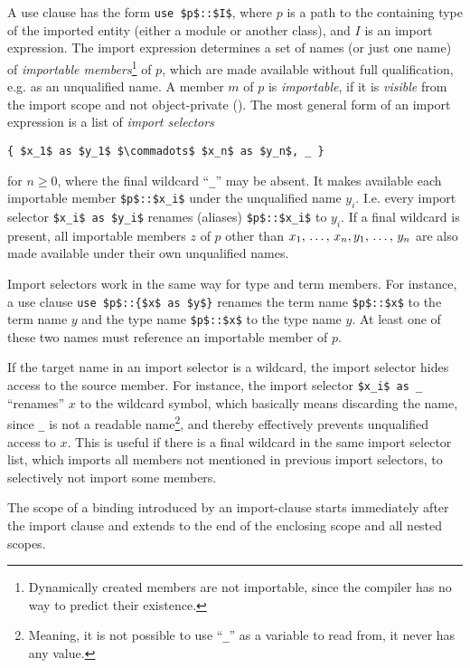 A use clause has the form \lstinline!use $p$::$I$!, where $p$ is a path to the containing type of the imported entity (either a module or another class), and $I$ is an import expression. The import expression determines a set of names (or just one name) of {\em importable members}\footnote{Dynamically created members are not importable, since the compiler has no way to predict their existence.} of $p$, which are made available without full qualification, e.g. as an unqualified name. A member $m$ of $p$ is {\em importable}, if it is {\em visible} from the import scope and not object-private (). The most general form of an import expression is a list of {\em import selectors}
\begin{lstlisting}
{ $x_1$ as $y_1$ $\commadots$ $x_n$ as $y_n$, _ }
\end{lstlisting}
for $n \ge 0$, where the final wildcard ``\lstinline!_!'' may be absent. It makes available each importable member \lstinline!$p$::$x_i$! under the unqualified name $y_i$. I.e. every import selector \lstinline!$x_i$ as $y_i$! renames (aliases) \lstinline!$p$::$x_i$! to $y_i$. If a final wildcard is present, all importable members $z$ of $p$ other than $x_1 ,\, \ldots ,\, x_n, y_1 ,\, \ldots ,\, y_n$ are also made available under their own unqualified names. 

Import selectors work in the same way for type and term members. For instance, a use clause \lstinline!use $p$::{$x$ as $y$}! renames the term name \lstinline!$p$::$x$! to the term name $y$ and the type name \lstinline!$p$::$x$! to the type name $y$. At least one of these two names must reference an importable member of $p$. 

If the target name in an import selector is a wildcard, the import selector hides access to the source member. For instance, the import selector \lstinline!$x_i$ as _! ``renames'' $x$ to the wildcard symbol, which basically means discarding the name, since \lstinline!_! is not a readable name\footnote{Meaning, it is not possible to use ``\lstinline!_!'' as a variable to read from, it never has any value.}, and thereby effectively prevents unqualified access to $x$. This is useful if there is a final wildcard in the same import selector list, which imports all members not mentioned in previous import selectors, to selectively not import some members. 

The scope of a binding introduced by an import-clause starts immediately after the import clause and extends to the end of the enclosing scope and all nested scopes. 

